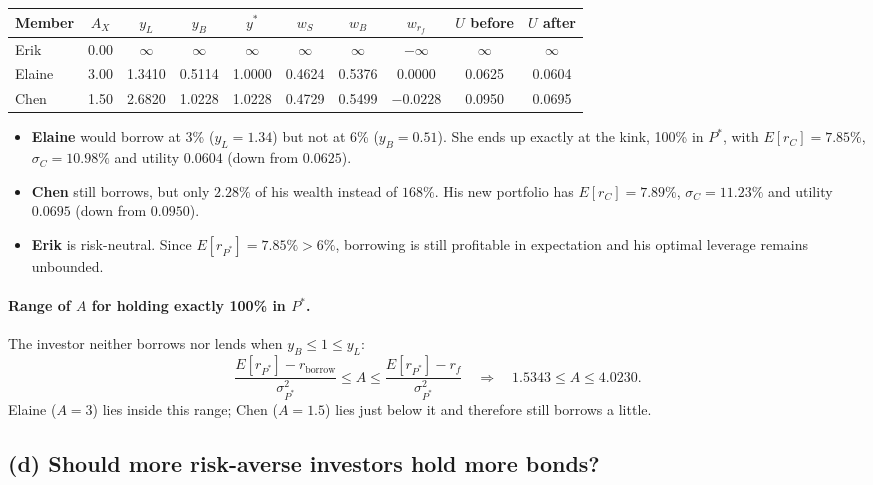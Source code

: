 \documentclass[11pt]{article}
\newcommand{\rborrow}{r_{\text{borrow}}}
\begin{document}
\begin{center}
\begin{tabular}{lccccccccc}
\toprule
Member & $A_X$ & $y_L$ & $y_B$ & $y^*$ & $w_S$ & $w_B$ & $w_{r_f}$ & $U$ before & $U$ after \\
\midrule
Erik   & 0.00 & $\infty$ & $\infty$ & $\infty$ & $\infty$ & $\infty$ & $-\infty$ & $\infty$ & $\infty$ \\
Elaine & 3.00 & 1.3410 & 0.5114 & 1.0000 & 0.4624 & 0.5376 & 0.0000 & 0.0625 & 0.0604 \\
Chen   & 1.50 & 2.6820 & 1.0228 & 1.0228 & 0.4729 & 0.5499 & $-0.0228$ & 0.0950 & 0.0695 \\
\bottomrule
\end{tabular}
\end{center}

\begin{itemize}
  \item \textbf{Elaine} would borrow at 3\% ($y_L = 1.34$) but not at 6\% ($y_B = 0.51$). She ends up exactly at the kink, 100\% in $P^*$, with $E[r_C] = 7.85\%$, $\sigma_C = 10.98\%$ and utility $0.0604$ (down from $0.0625$).
  \item \textbf{Chen} still borrows, but only $2.28\%$ of his wealth instead of $168\%$. His new portfolio has $E[r_C] = 7.89\%$, $\sigma_C = 11.23\%$ and utility $0.0695$ (down from $0.0950$).
  \item \textbf{Erik} is risk-neutral. Since $E[r_{P^*}] = 7.85\% > 6\%$, borrowing is still profitable in expectation and his optimal leverage remains unbounded.
\end{itemize}

\paragraph{Range of $A$ for holding exactly 100\% in $P^*$.}
The investor neither borrows nor lends when $y_B \le 1 \le y_L$:
\[
\frac{E[r_{P^*}] - \rborrow}{\sigma_{P^*}^2} \le A \le \frac{E[r_{P^*}] - r_f}{\sigma_{P^*}^2}
\quad\Longrightarrow\quad
1.5343 \le A \le 4.0230.
\]
Elaine ($A = 3$) lies inside this range; Chen ($A = 1.5$) lies just below it and therefore still borrows a little.

\subsection*{(d) Should more risk-averse investors hold more bonds?}
\end{document}
